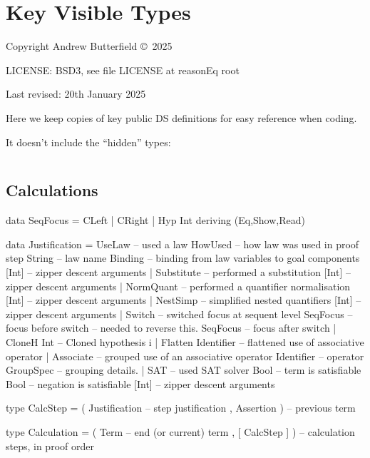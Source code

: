 \chapter{Key Visible Types}

Copyright  Andrew Butterfield \copyright\ 2025

LICENSE: BSD3, see file LICENSE at reasonEq root

Last revised: 20th January 2025

Here we keep copies of key public DS definitions
for easy reference when coding.

It doesn't include the ``hidden'' types:
\begin{verbatim}
\end{verbatim}

\newpage

\section{Calculations}

\begin{code}
data SeqFocus = CLeft | CRight | Hyp Int deriving (Eq,Show,Read)

data Justification
  = UseLaw             -- used a law
      HowUsed              -- how law was used in proof step
      String               -- law name
      Binding              -- binding from law variables to goal components
      [Int]                -- zipper descent arguments
  | Substitute         -- performed a substitution
      [Int]                -- zipper descent arguments
  | NormQuant          -- performed a quantifier normalisation
      [Int]                -- zipper descent arguments
  | NestSimp           -- simplified nested quantifiers
      [Int]                -- zipper descent arguments
  | Switch             -- switched focus at sequent level
      SeqFocus             -- focus before switch -- needed to reverse this.
      SeqFocus             -- focus after switch
  | CloneH Int         --  Cloned hypothesis i
  | Flatten Identifier -- flattened use of associative operator
  | Associate          -- grouped use of an associative operator
      Identifier           -- operator
      GroupSpec            -- grouping details.
  | SAT                -- used SAT solver
    Bool                   -- term is satisfiable
    Bool                   -- negation is satisfiable
    [Int]                  -- zipper descent arguments

type CalcStep
  = ( Justification  -- step justification
    , Assertion )         -- previous term

type Calculation
  = ( Term -- end (or current) term
    , [ CalcStep ] )  -- calculation steps, in proof order
\end{code}

